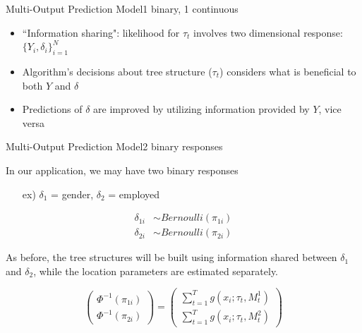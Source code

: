 \documentclass{beamer}
\begin{document}
\begin{frame}{Multi-Output Prediction Model}{1 binary, 1 continuous }
\begin{itemize}
\item ``Information sharing": likelihood for $\tau_t$ involves two dimensional response: $\{Y_i, \delta_i\}_{i = 1}^N$
\item Algorithm's decisions about tree structure ($\tau_t$) considers what is beneficial to both $Y$ and $\delta$
\item Predictions of $\delta$ are improved by utilizing information provided by $Y$, vice versa
\end{itemize}
\end{frame}


\begin{frame}{Multi-Output Prediction Model}{2 binary responses}

In our application, we may have two binary responses
\begin{itemize}
\item[ex)] $\delta_1$ = gender, $\delta_2$ = employed
\end{itemize}


\begin{align}
\delta_{1i} &\sim Bernoulli(\pi_{1i}) \\
\delta_{2i} &\sim Bernoulli(\pi_{2i})
\end{align}

As before, the tree structures will be built using information shared between $\delta_1$ and $\delta_2$, while the location parameters are estimated separately. 

$$\begin{pmatrix}\Phi^{-1}(\pi_{1i}) \\ \Phi^{-1}(\pi_{2i}) \end{pmatrix} = 
\begin{pmatrix}\sum_{t=1}^T g(x_i ; \tau_t, M^{1}_t)\\%
\sum_{t=1}^T g(x_i ; \tau_t, M^{2}_t)%
\end{pmatrix} $$


\end{frame}
\end{document}
